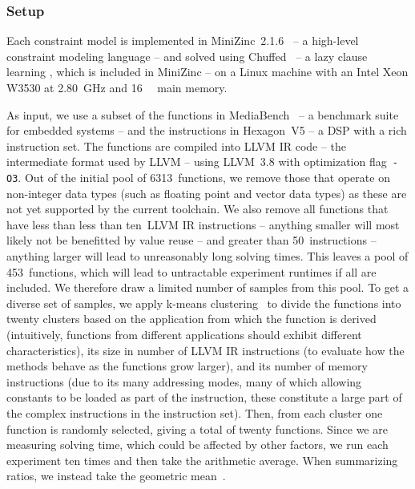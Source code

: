 \subsubsection{Setup}

Each \gls{constraint model} is implemented in \mbox{\gls{MiniZinc}
  2.1.6}~\cite{NethercoteEtAl:2007} -- a high-level \gls{constraint} modeling
language -- and solved using \gls{Chuffed}~\cite{Chu:2011} -- a \gls{lazy clause
  learning} , which is included in \gls{MiniZinc} --
on a Linux machine with an \gls{Intel} Xeon W3530 at \SI{2.80}{\GHz} and
\SI{16}{\giga\byte} main memory.

As input, we use a subset of the \glspl{function} in
\gls{MediaBench}~\cite{LeeEtAl:1997} -- a benchmark suite for embedded systems
-- and the \glspl{instruction} in \gls{Hexagon}~V5 -- a \gls{DSP} with a rich
\gls{instruction set}.
%
The \glspl{function} are compiled into \gls{LLVM} \gls{IR} code -- the
intermediate format used by \gls{LLVM} -- using \mbox{\gls{LLVM} 3.8} with
optimization flag~\texttt{-O3}.
%
Out of the initial pool of \num{6313}~\glspl{function}, we remove those that
operate on non-integer data types (such as floating point and vector data types)
as these are not yet supported by the current toolchain.
%
We also remove all \glspl{function} that have less than less than ten~\gls{LLVM}
\gls{IR} \glspl{instruction} -- anything smaller will most likely not be
benefitted by \gls{value reuse} -- and greater than \num{50}~\glspl{instruction}
-- anything larger will lead to unreasonably long solving times.
%
This leaves a pool of \num{453}~\glspl{function}, which will lead to untractable
experiment runtimes if all are included.
%
We therefore draw a limited number of samples from this pool.
%
To get a diverse set of samples, we apply \gls{k-means
  clustering}~\cite{PhansalkarEtAl:2005} to divide the \glspl{function} into
twenty clusters based on the application from which the \gls{function} is
derived (intuitively, \glspl{function} from different applications should
exhibit different characteristics), its size in number of \gls{LLVM} \gls{IR}
\glspl{instruction} (to evaluate how the methods behave as the \glspl{function}
grow larger), and its number of memory \glspl{instruction} (due to its many
addressing modes, many of which allowing constants to be loaded as part of the
\gls{instruction}, these constitute a large part of the complex
\glspl{instruction} in the \gls{instruction set}).
%
Then, from each cluster one \gls{function} is randomly selected, giving a total
of twenty \glspl{function}.
%
Since we are measuring solving time, which could be affected by other factors,
we run each experiment ten times and then take the arithmetic average.
%
When summarizing ratios, we instead take the geometric
mean~\cite{FlemingWallace:1986}.


